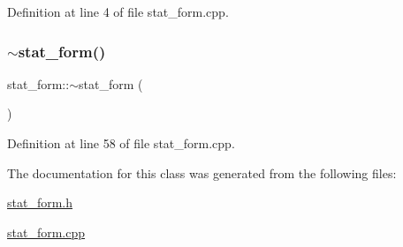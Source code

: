 Definition at line 4 of file stat\+\_\+form.\+cpp.

\mbox{\label{classstat__form_a7a0e7f191915a1fcf7e2043bc39448b0}} 
\subsubsection{\texorpdfstring{$\sim$stat\_form()}{~stat\_form()}}
{\footnotesize\ttfamily stat\+\_\+form\+::$\sim$stat\+\_\+form (\begin{DoxyParamCaption}{ }\end{DoxyParamCaption})}



Definition at line 58 of file stat\+\_\+form.\+cpp.



The documentation for this class was generated from the following files\+:\begin{DoxyCompactItemize}
\item 
\mbox{\hyperlink{stat__form_8h}{stat\+\_\+form.\+h}}\item 
\mbox{\hyperlink{stat__form_8cpp}{stat\+\_\+form.\+cpp}}\end{DoxyCompactItemize}
